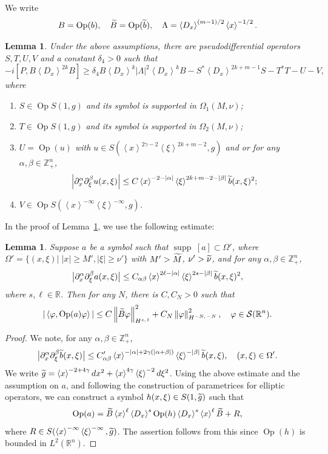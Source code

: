 \documentclass[10pt]{amsart}
\newtheorem{lemm}[cdrthm]{Lemma}
\theoremstyle{definition}
\renewcommand*\a{\alpha}
\renewcommand*\b{\beta}
\renewcommand*\c{\gamma}
\renewcommand*\d{\delta}
\newcommand*\f{\varphi}
\newcommand*\n{\nu}
\newcommand*\x{\xi}
\renewcommand{\L}{\Lambda}
\renewcommand{\O}{\Omega}
\DeclareMathOperator{\Op}{Op}
\newcommand*\re{\mathbb{R}}
\newcommand*\ze{\mathbb{Z}}
\newcommand{\clS}{\mathcal{S}}
\newcommand*\pa{\partial}
\DeclareMathOperator{\supp}{supp\;}
\newcommand{\jap}[1]{\left\langle #1 \right\rangle}
\newcommand{\norm}[1]{\left\| #1 \right\|}
\newcommand{\bigabs}[1]{\bigl| #1 \bigr|}
\let\oldtilde\tilde
\renewcommand*{\tilde}[1]{\mathchoice{\widetilde{#1}}{\widetilde{#1}}{\oldtilde{#1}}{\oldtilde{#1}}}
\begin{document}
We write
\[
B=\Op(b), \quad \tilde B =\Op(\tilde b), \quad \L=\jap{D_x}^{(m-1)/2}\jap{x}^{-1/2}.
\]

\begin{lemm}\label{radcom}
Under the above assumptions, there are pseudodifferential operators
$S,T,U, V$ and a constant $\d_4>0$ such that
\[
-i\left[P, B \jap{D_x}^{2k} B\right] \geq \d_4 B\jap{D_x}^k |\L|^2\jap{D_x}^k B -S^*\jap{D_x}^{2k+m-1}S-T^*T-U -V,
\]
where
\begin{enumerate}
\item $S\in \Op S(1,g)$ and its symbol is supported in $\O_1(M,\n)$;
\item $T\in \Op S(1, g)$ and its symbol is supported in $\O_2(M,\n)$;
\item $U=\Op(u)$ with $u\in S(\jap{x}^{2\c-2}\jap{\x}^{2k+m-2},g)$ and or for any $\a,\b\in\ze_+^n$,
\[
\left|\pa_{x}^{\a}\pa_{\x}^{\b}u(x,\x)\right|\leq C\jap{x}^{-2-|\a|}\jap{\x}^{2k+m-2-|\b|} \tilde b(x,\x)^2;
\]
\item $V\in \Op S(\jap{x}^{-\infty}\jap{\x}^{-\infty},g)$.
\end{enumerate}
\end{lemm}

In the proof of Lemma~\ref{radcom}, we use the following estimate:

\begin{lemm}\label{radell}
Suppose $a$ be a symbol such that $\supp[a]\subset\O'$, where\linebreak$\O'=\{(x,\x)|\;|x|\geq M',|\x|\geq \n'\}$ with $M'>\tilde M$, $\n'>\tilde\n$, and for any $\a,\b\in\ze_+^n$,
\[
\bigabs{\pa_x^\a\pa_\x^\b a(x,\x)}\leq C_{\a\b}\jap{x}^{2\ell-|\a|}\jap{\x}^{2s-|\b|}\tilde b(x,\x)^2,
\]
where $s,\ell\in\re$. Then for any $N$, there is $C,C_N>0$ such that
\[
|\jap{\f,\Op(a)\f}|\leq C \norm{\tilde B\f}^2_{H^{s,\,\ell}}+C_N\norm{\f}^2_{H^{-N,\,-N}},
\quad \f\in\clS(\re^n).
\]
\end{lemm}

\begin{proof}
We note, for any $\a,\b\in\ze_+^n$,
\[
\bigabs{\pa_x^\a\pa_\x^\b \tilde b(x,\x)}\leq C'_{\a\b}\jap{x}^{-|\a|+2\c(|\a+\b|)}\jap{\x}^{-|\b|}\tilde b(x,\x),
\quad(x,\x)\in\O'.
\]
We write $\tilde g= \jap{x}^{-2+4\c}dx^2+\jap{x}^{4\c}\jap{\x}^{-2}d\x^2$. Using the above estimate and the assumption on $a$, and following the construction of parametrices for elliptic operators, we can construct a symbol $h(x,\x)\in S(1,\tilde g)$ such that
\[
\Op(a) = \tilde B \jap{x}^\ell \jap{D_x}^s \Op(h) \jap{D_x}^s \jap{x}^\ell \tilde B +R,
\]
where $R\in S(\jap{x}^{-\infty}\jap{\x}^{-\infty},\tilde g)$. The assertion follows from this since $\Op(h)$ is bounded in $L^2(\re^n)$.
\end{proof}
\end{document}
